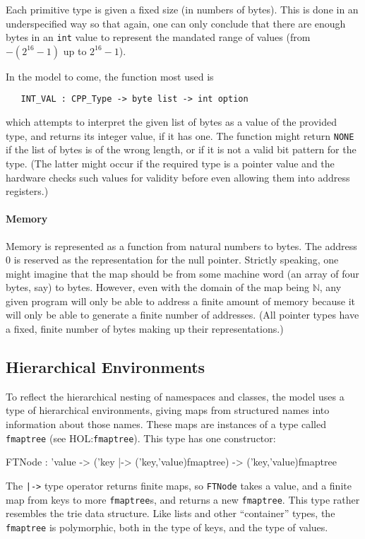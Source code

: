 \documentclass[11pt]{article}
\newcommand{\HOLfile}[1]{HOL:\texttt{#1}}
\begin{document}
Each primitive type is given a fixed size (in numbers of bytes).  This
is done in an underspecified way so that again, one can only conclude
that there are enough bytes in an \texttt{int} value to represent the
mandated range of values (from $-(2^{16} - 1)$ up to $2^{16} - 1$).

In the model to come, the function most used is
\begin{verbatim}
   INT_VAL : CPP_Type -> byte list -> int option
\end{verbatim}
which attempts to interpret the given list of bytes as a value of the
provided type, and returns its integer value, if it has one.  The
function might return \texttt{NONE} if the list of bytes is of the
wrong length, or if it is not a valid bit pattern for the type.  (The
latter might occur if the required type is a pointer value and the
hardware checks such values for validity before even allowing them
into address registers.)

\paragraph{Memory}
Memory is represented as a function from natural numbers to bytes.
The address 0 is reserved as the representation for the null pointer.
Strictly speaking, one might imagine that the map should be from some
machine word (an array of four bytes, say) to bytes.  However, even
with the domain of the map being $\mathbb{N}$, any given program will
only be able to address a finite amount of memory because it will only
be able to generate a finite number of addresses.  (All pointer types
have a fixed, finite number of bytes making up their representations.)

\subsection{Hierarchical Environments}
\label{sec:hierarchical-environments}

To reflect the hierarchical nesting of namespaces and classes, the
model uses a type of hierarchical environments, giving maps from
structured names into information about those names.  These maps are
instances of a type called \texttt{fmaptree} (see \HOLfile{fmaptree}).
This type has one constructor:
\begin{stdrule}
   FTNode : 'value -> ('key |-> ('key,'value)fmaptree) ->
            ('key,'value)fmaptree
\end{stdrule}
The \texttt{|->} type operator returns finite maps, so
\texttt{FTNode} takes a value, and a finite map from keys to more
\texttt{fmaptree}s, and returns a new \texttt{fmaptree}.  This type
rather resembles the trie data structure.  Like lists and other
``container'' types, the \texttt{fmaptree} is polymorphic, both in the
type of keys, and the type of values.
\end{document}
